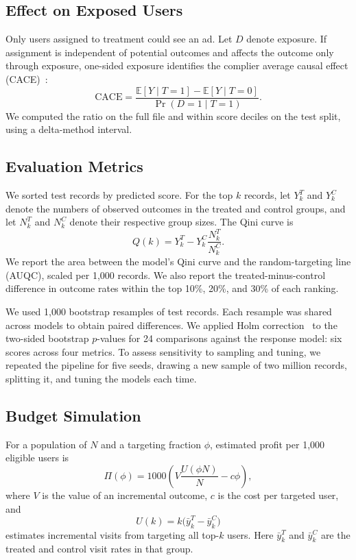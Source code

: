 \documentclass[conference]{IEEEtran}
\begin{document}
\subsection{Effect on Exposed Users}

Only users assigned to treatment could see an ad. Let \(D\) denote
exposure. If assignment is independent of potential outcomes and
affects the outcome only through exposure, one-sided exposure identifies
the complier average causal effect (CACE)~\cite{bloom1984,angrist1996}:
\begin{equation}
  \mathrm{CACE}
  =
  \frac{\mathbb{E}[Y \mid T=1]-\mathbb{E}[Y \mid T=0]}
       {\Pr(D=1 \mid T=1)}.
\end{equation}
We computed the ratio on the full file and within score deciles on the
test split, using a delta-method interval.

\subsection{Evaluation Metrics}

We sorted test records by predicted score. For the top \(k\) records,
let \(Y_k^T\) and \(Y_k^C\) denote the numbers of observed outcomes in
the treated and control groups, and let \(N_k^T\) and \(N_k^C\) denote
their respective group sizes. The Qini curve is
\begin{equation}
  Q(k) = Y_k^T - Y_k^C \frac{N_k^T}{N_k^C}.
\end{equation}
We report the area between the model's Qini curve and the random-targeting
line (AUQC), scaled per 1,000 records. We also report the treated-minus-control
difference in outcome rates within the top 10\%, 20\%, and 30\% of each
ranking.

We used 1,000 bootstrap resamples of test records. Each resample was
shared across models to obtain paired differences. We applied Holm
correction~\cite{holm1979} to the two-sided bootstrap \(p\)-values for
24 comparisons against the response model: six scores across four
metrics. To assess sensitivity to sampling and tuning, we repeated the
pipeline for five seeds, drawing a new sample of two million records,
splitting it, and tuning the models each time.

\subsection{Budget Simulation}

For a population of \(N\) and a targeting fraction \(\phi\), estimated
profit per 1,000 eligible users is
\begin{equation}
  \Pi(\phi) =
  1000\left(V\frac{U(\phi N)}{N}-c\phi\right),
\end{equation}
where \(V\) is the value of an incremental outcome, \(c\) is the cost
per targeted user, and
\begin{equation}
  U(k) = k\bigl(\bar{y}_k^T-\bar{y}_k^C\bigr)
\end{equation}
estimates incremental visits from targeting all top-\(k\) users.
Here \(\bar{y}_k^T\) and \(\bar{y}_k^C\) are the treated and control
visit rates in that group.
\end{document}
